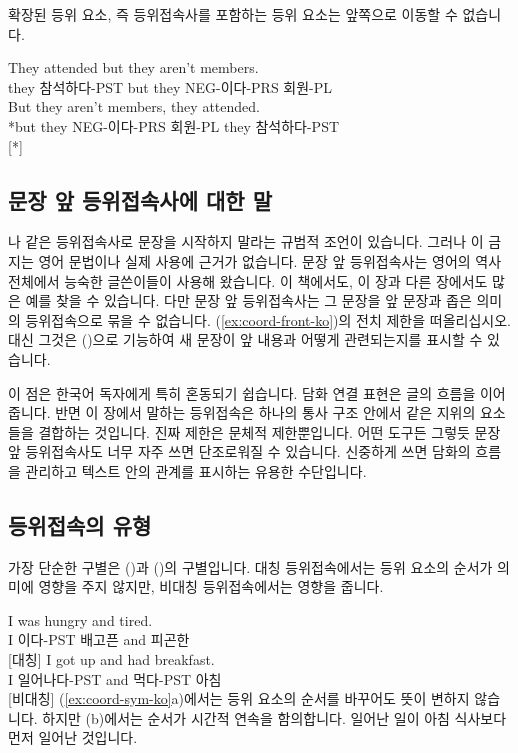 확장된 등위 요소, 즉 등위접속사를 포함하는 등위 요소는 앞쪽으로 이동할 수 없습니다.

\ea \label{ex:coord-front-ko}
    \ea \gll They attended but they aren't members.\\
        they 참석하다-PST but they NEG-이다-PRS 회원-PL\\
    \glt {}
    \ex \gll *But they aren't members, they attended.\\
        *but they NEG-이다-PRS 회원-PL they 참석하다-PST\\
    \glt {} [*]
    \z
\z

\subsection{문장 앞 등위접속사에 대한 말}

나  같은 등위접속사로 문장을 시작하지 말라는 규범적 조언이 있습니다. 그러나 이 금지는 영어 문법이나 실제 사용에 근거가 없습니다. 문장 앞 등위접속사는 영어의 역사 전체에서 능숙한 글쓴이들이 사용해 왔습니다. 이 책에서도, 이 장과 다른 장에서도 많은 예를 찾을 수 있습니다. 다만 문장 앞 등위접속사는 그 문장을 앞 문장과 좁은 의미의 등위접속으로 묶을 수 없습니다. (\ref{ex:coord-front-ko})의 전치 제한을 떠올리십시오. 대신 그것은 ()으로 기능하여 새 문장이 앞 내용과 어떻게 관련되는지를 표시할 수 있습니다.

이 점은 한국어 독자에게 특히 혼동되기 쉽습니다. 담화 연결 표현은 글의 흐름을 이어 줍니다. 반면 이 장에서 말하는 등위접속은 하나의 통사 구조 안에서 같은 지위의 요소들을 결합하는 것입니다. 진짜 제한은 문체적 제한뿐입니다. 어떤 도구든 그렇듯 문장 앞 등위접속사도 너무 자주 쓰면 단조로워질 수 있습니다. 신중하게 쓰면 담화의 흐름을 관리하고 텍스트 안의 관계를 표시하는 유용한 수단입니다.

\subsection{등위접속의 유형}

가장 단순한 구별은 ()과 ()의 구별입니다. 대칭 등위접속에서는 등위 요소의 순서가 의미에 영향을 주지 않지만, 비대칭 등위접속에서는 영향을 줍니다.

\ea \label{ex:coord-sym-ko}
    \ea \gll I was hungry and tired.\\
        I 이다-PST 배고픈 and 피곤한\\
    \glt {} [대칭]
    \ex \gll I got up and had breakfast.\\
        I 일어나다-PST and 먹다-PST 아침\\
    \glt {} [비대칭]
    \z
\z
(\ref{ex:coord-sym-ko}a)에서는 등위 요소의 순서를 바꾸어도 뜻이 변하지 않습니다. 하지만 (b)에서는 순서가 시간적 연속을 함의합니다. 일어난 일이 아침 식사보다 먼저 일어난 것입니다.

